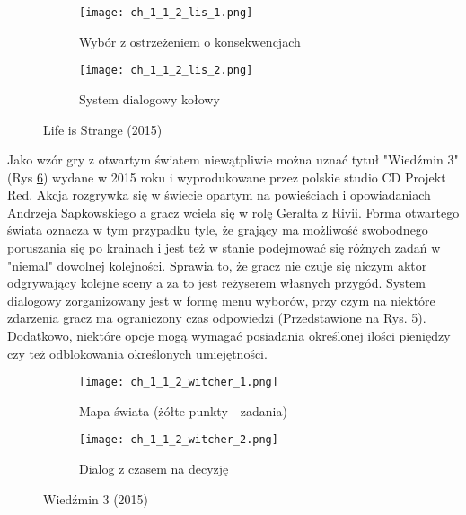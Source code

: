 \begin{figure}[h]
	\begin{subfigure}{0.49\textwidth}
		\caption{Wybór z ostrzeżeniem o konsekwencjach}
		\texttt{[image: ch\_1\_1\_2\_lis\_1.png]}
		\label{subfig:ch_1_1_2_lis_1}
	\end{subfigure}
	\begin{subfigure}{0.49\textwidth}
		\caption{System dialogowy kołowy}
		\texttt{[image: ch\_1\_1\_2\_lis\_2.png]}
		\label{subfig:ch_1_1_2_lis_2}
	\end{subfigure}
	\caption{Life is Strange (2015)}
	\label{fig:ch1_1_2_lis}
\end{figure}

\newpage

Jako wzór gry z otwartym światem niewątpliwie można uznać tytuł "Wiedźmin 3" (Rys \ref{fig:ch1_1_2_witcher})
wydane w 2015 roku i wyprodukowane przez polskie studio CD Projekt Red. Akcja rozgrywka się w świecie
opartym na powieściach i opowiadaniach Andrzeja Sapkowskiego a gracz wciela się w rolę Geralta z Rivii.
Forma otwartego świata oznacza w tym przypadku tyle, że grający ma możliwość swobodnego poruszania się
po krainach i jest też w stanie podejmować się różnych zadań w "niemal" dowolnej kolejności. Sprawia to, że
gracz nie czuje się niczym aktor odgrywający kolejne sceny a za to jest reżyserem własnych przygód.
System dialogowy zorganizowany jest w formę menu wyborów, przy czym na niektóre zdarzenia gracz ma
ograniczony czas odpowiedzi (Przedstawione na Rys. \ref{subfig:ch_1_1_2_witcher_2}). Dodatkowo, niektóre
opcje mogą wymagać posiadania określonej ilości pieniędzy czy też odblokowania określonych umiejętności.

\begin{figure}[h]
	\begin{subfigure}{0.49\textwidth}
		\caption{Mapa świata (żółte punkty - zadania)}
		\texttt{[image: ch\_1\_1\_2\_witcher\_1.png]}
		\label{subfig:ch_1_1_2_witcher_1}
	\end{subfigure}
	\begin{subfigure}{0.49\textwidth}
		\caption{Dialog z czasem na decyzję}
		\texttt{[image: ch\_1\_1\_2\_witcher\_2.png]}
		\label{subfig:ch_1_1_2_witcher_2}
	\end{subfigure}
	\caption{Wiedźmin 3 (2015)}
	\label{fig:ch1_1_2_witcher}
\end{figure}

\newpage

